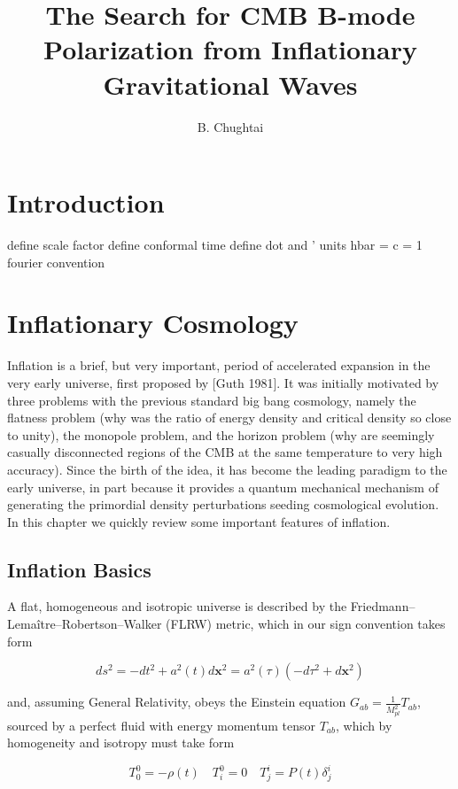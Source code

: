 \documentclass[a4paper,10pt]{article}
\title{\boldmath The Search for CMB B-mode Polarization from Inflationary Gravitational Waves}
\author{B. Chughtai}
\affiliation{University of Cambridge, Cambridge, UK}
\renewcommand{\v}[1]{\mathbf{#1}}
\newcommand{\Mp}{M_{pl}}
\begin{document}
\maketitle
\flushbottom


\section{Introduction}

define scale factor
define conformal time
define dot and '
units hbar = c = 1
fourier convention

\section{Inflationary Cosmology}

Inflation is a brief, but very important, period of accelerated expansion in the very early universe, first proposed by [Guth 1981]. It was initially motivated by three problems with the previous standard big bang cosmology, namely the flatness problem (why was the ratio of energy density and critical density so close to unity), the monopole problem, and the horizon problem (why are seemingly casually disconnected regions of the CMB at the same temperature to very high accuracy). Since the birth of the idea, it has become the leading paradigm to the early universe, in part because it provides a quantum mechanical mechanism of generating the primordial density perturbations seeding cosmological evolution. In this chapter we quickly review some important features of inflation.

\subsection{Inflation Basics}

A flat, homogeneous and isotropic universe is described by the Friedmann–Lemaître–Robertson–Walker (FLRW) metric, which in our sign convention takes form

\begin{equation}
\label{FLRW}
ds^2 = - dt^2 + a^2(t)d\v{x}^2 = a^2(\tau)(-d\tau^2+d\v{x}^2)
\end{equation}

and, assuming General Relativity, obeys the Einstein equation $G_{ab} = \frac{1}{\Mp^2} T_{ab}$, sourced by a perfect fluid with energy momentum tensor $T_{ab}$, which by homogeneity and isotropy must take form

\begin{equation}
\label{densityandpressure}
T^0_0 = - \rho(t) \quad T^0_i = 0 \quad T^i_j = P(t)\delta^i_j
\end{equation}
\end{document}
